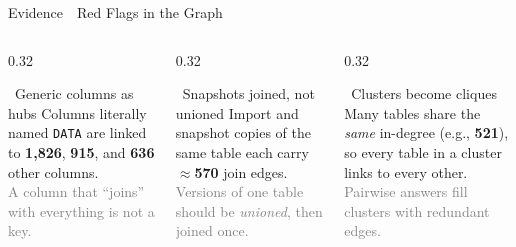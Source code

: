 \documentclass[aspectratio=169]{beamer}
\newcommand{\hred}[1]{\textcolor{tug}{\textbf{#1}}}
\newcommand{\apptitle}[3]{\textcolor{#1}{#2}~\textcolor{black!30}{\textbar}~#3}
\begin{document}
\begin{frame}{\apptitle{tugb}{Evidence}{Red Flags in the Graph}}
\footnotesize
\vspace{2mm}
\begin{columns}[T]
\begin{column}{0.32\textwidth}
\begin{block}{\faHashtag~Generic columns as hubs}
\vspace{1mm}
Columns literally named \texttt{DATA} are linked to
\hred{1,826}, \hred{915}, and \hred{636} other columns.\\[3pt]
\textcolor{gray}{A column that ``joins'' with everything is not a key.}
\vspace{1mm}
\end{block}
\end{column}
\begin{column}{0.32\textwidth}
\begin{block}{\faCopy~Snapshots joined, not unioned}
\vspace{1mm}
Import and snapshot copies of the same table each carry
\hred{$\approx$570} join edges.\\[3pt]
\textcolor{gray}{Versions of one table should be \emph{unioned}, then joined once.}
\vspace{1mm}
\end{block}
\end{column}
\begin{column}{0.32\textwidth}
\begin{block}{\faProjectDiagram~Clusters become cliques}
\vspace{1mm}
Many tables share the \emph{same} in-degree (e.g., \hred{521}), so every table in a cluster links to every other.\\[3pt]
\textcolor{gray}{Pairwise answers fill clusters with redundant edges.}
\vspace{1mm}
\end{block}
\end{column}
\end{columns}


\end{frame}
\end{document}
